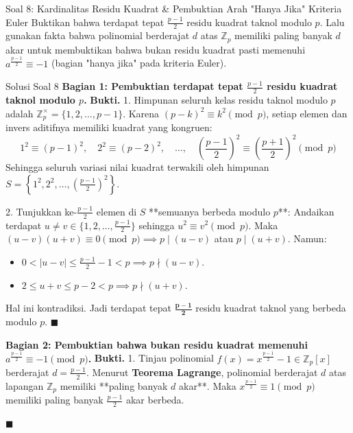 \documentclass[11pt,a4paper]{article}
\newenvironment{proof}{\noindent\textbf{Bukti.}}{\hfill$\blacksquare$\vspace{0.2em}}
\begin{document}
\vspace{0.3cm}

\begin{soalbox}{Soal 8: Kardinalitas Residu Kuadrat \& Pembuktian Arah "Hanya Jika" Kriteria Euler}
Buktikan bahwa terdapat tepat $\frac{p-1}{2}$ residu kuadrat taknol modulo $p$. Lalu gunakan fakta bahwa polinomial berderajat $d$ atas $\mathbb{Z}_p$ memiliki paling banyak $d$ akar untuk membuktikan bahwa bukan residu kuadrat pasti memenuhi $a^{\frac{p-1}{2}} \equiv -1$ (bagian "hanya jika" pada kriteria Euler).
\end{soalbox}

\begin{solusibox}{Solusi Soal 8}
\textbf{Bagian 1: Pembuktian terdapat tepat $\frac{p-1}{2}$ residu kuadrat taknol modulo $p$.}
\begin{proof}
1. Himpunan seluruh kelas residu taknol modulo $p$ adalah $\mathbb{Z}_p^\times = \{1, 2, \ldots, p-1\}$.  
Karena $(p - k)^2 \equiv k^2 \pmod p$, setiap elemen dan invers aditifnya memiliki kuadrat yang kongruen:
\[
1^2 \equiv (p-1)^2, \quad 2^2 \equiv (p-2)^2, \quad \ldots, \quad \left(\frac{p-1}{2}\right)^2 \equiv \left(\frac{p+1}{2}\right)^2 \pmod p
\]
Sehingga seluruh variasi nilai kuadrat terwakili oleh himpunan $S = \left\{1^2, 2^2, \ldots, \left(\frac{p-1}{2}\right)^2\right\}$.

2. Tunjukkan ke-$\frac{p-1}{2}$ elemen di $S$ **semuanya berbeda modulo $p$**:  
Andaikan terdapat $u \neq v \in \{1, 2, \ldots, \frac{p-1}{2}\}$ sehingga $u^2 \equiv v^2 \pmod p$.  
Maka $(u - v)(u + v) \equiv 0 \pmod p \implies p \mid (u - v)$ atau $p \mid (u + v)$.  
Namun:
\begin{itemize}
    \item $0 < |u - v| \le \frac{p-1}{2} - 1 < p \implies p \nmid (u - v)$.
    \item $2 \le u + v \le p - 2 < p \implies p \nmid (u + v)$.
\end{itemize}
Hal ini kontradiksi. Jadi terdapat tepat $\mathbf{\frac{p-1}{2}}$ residu kuadrat taknol yang berbeda modulo $p$.
\end{proof}

\textbf{Bagian 2: Pembuktian bahwa bukan residu kuadrat memenuhi $a^{\frac{p-1}{2}} \equiv -1 \pmod p$.}
\begin{proof}
1. Tinjau polinomial $f(x) = x^{\frac{p-1}{2}} - 1 \in \mathbb{Z}_p[x]$ berderajat $d = \frac{p-1}{2}$.  
Menurut \textbf{Teorema Lagrange}, polinomial berderajat $d$ atas lapangan $\mathbb{Z}_p$ memiliki **paling banyak $d$ akar**.  
Maka $x^{\frac{p-1}{2}} \equiv 1 \pmod p$ memiliki paling banyak $\frac{p-1}{2}$ akar berbeda.


\end{proof}
\end{solusibox}
\end{document}
